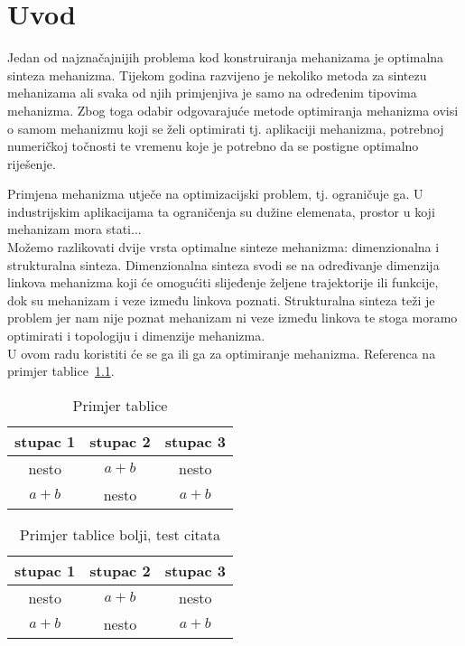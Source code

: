 \chapter{Uvod}
Jedan od najznačajnijih problema kod konstruiranja mehanizama je optimalna sinteza mehanizma.
Tijekom godina razvijeno je nekoliko metoda za sintezu mehanizama \cite{Chiang2000, Hansen2009} ali svaka od njih primjenjiva je samo na određenim tipovima mehanizma. 
Zbog toga odabir odgovarajuće metode optimiranja mehanizma ovisi o samom mehanizmu koji se želi optimirati tj. aplikaciji mehanizma, potrebnoj numeričkoj točnosti te vremenu koje je potrebno da se postigne optimalno riješenje.

Primjena mehanizma utječe na optimizacijski problem, tj. ograničuje ga. U industrijskim aplikacijama ta ograničenja su dužine elemenata, prostor u koji mehanizam mora stati...\\

Možemo razlikovati dvije vrsta optimalne sinteze mehanizma: dimenzionalna i strukturalna sinteza. 
Dimenzionalna sinteza svodi se na određivanje dimenzija linkova mehanizma koji će omogućiti slijeđenje željene trajektorije ili funkcije, dok su mehanizam i veze između linkova poznati.
Strukturalna sinteza teži je problem jer nam nije poznat mehanizam ni veze između linkova te stoga moramo optimirati i topologiju i dimenzije mehanizma.\\

U ovom radu koristiti će se \acrlong{ga} ili \acrshort{ga} \cite{McCall2005, Cabrera2002} za optimiranje mehanizma.
Referenca na primjer tablice~\ref{tbl:primjer}.


\begin{table}[h!]
\centering
\caption{Primjer tablice}
\label{tbl:primjer}
\begin{tabular}{ccc}
stupac 1 & stupac 2 & stupac 3\\
\hline
\hline
nesto & $a+b$ & nesto\\
$a+b$ & nesto & $a+b$\\
\hline
\end{tabular}
\end{table}




\begin{table}[h!]
	\centering
	\caption[Primjer tablice bolji, test citata]{Primjer tablice bolji, test citata \cite{Chiang2000}}
	\label{tbl:primjer2}
	\begin{tabular}{ccc}
		\toprule
		stupac 1 & stupac 2 & stupac 3\\ 
		\midrule
		nesto & $a+b$ & nesto\\
		$a+b$ & nesto & $a+b$\\ 
		\bottomrule
	\end{tabular}
\end{table}
